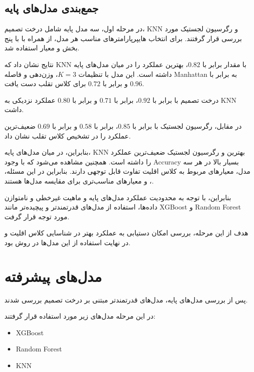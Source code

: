 \documentclass[10pt,a4paper,twocolumn]{article}
\begin{document}
\subsection{جمع‌بندی مدل‌های پایه}

در مرحله اول، سه مدل پایه شامل درخت تصمیم، KNN و رگرسیون لجستیک
مورد بررسی قرار گرفتند. برای انتخاب هایپرپارامترهای مناسب هر مدل،
از  همراه با  با پنج بخش و
معیار  استفاده شد.

نتایج نشان داد که KNN با مقدار  برابر با $0.82$،
بهترین عملکرد را در میان مدل‌های پایه داشته است. این مدل با
تنظیمات $K=3$، وزن‌دهی  و فاصله Manhattan به
 برابر با $0.96$ و  برابر با $0.72$
برای کلاس تقلب دست یافت.

درخت تصمیم با  برابر با $0.92$،
 برابر با $0.71$ و  برابر با $0.80$
عملکرد نزدیکی به KNN داشت.

در مقابل، رگرسیون لجستیک با
 برابر با $0.85$،
 برابر با $0.58$ و
 برابر با $0.69$
ضعیف‌ترین عملکرد را در تشخیص کلاس تقلب نشان داد.

بنابراین، در میان مدل‌های پایه، KNN بهترین و رگرسیون لجستیک
ضعیف‌ترین عملکرد را داشته است. همچنین مشاهده می‌شود که با
وجود Accuracy بسیار بالا در هر سه مدل، معیارهای مربوط به کلاس
اقلیت تفاوت قابل توجهی دارند. بنابراین در این مسئله،
،  و  معیارهای مناسب‌تری
برای مقایسه مدل‌ها هستند.

بنابراین، با توجه به محدودیت عملکرد مدل‌های پایه و ماهیت
غیرخطی و نامتوازن داده‌ها، استفاده از مدل‌های قدرتمندتر و
پیچیده‌تر مانند XGBoost و Random Forest مورد توجه قرار گرفت.

هدف از این مرحله، بررسی امکان دستیابی به عملکرد بهتر در
شناسایی کلاس اقلیت و در نهایت استفاده از این مدل‌ها در روش
 بود.


\section{مدل‌های پیشرفته}

پس از بررسی مدل‌های پایه، مدل‌های قدرتمندتر مبتنی بر
درخت تصمیم بررسی شدند.

در این مرحله مدل‌های زیر مورد استفاده قرار گرفتند:

\begin{itemize}
    \item XGBoost
    \item Random Forest
    \item KNN
\end{itemize}
\end{document}
